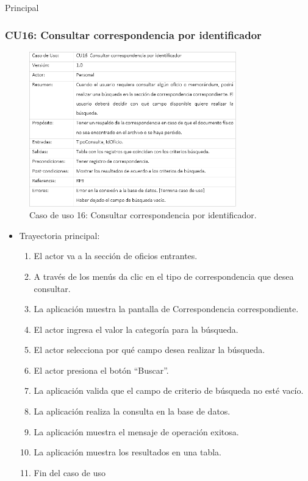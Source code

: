 \begin{UCtrayectoria}{Principal}
		\subsubsection{CU16: Consultar correspondencia por identificador}
\begin{figure}[htbp!]
		\centering
			\includegraphics[width=0.8\textwidth]{images/CU/CU16}
		\caption{Caso de uso 16: Consultar correspondencia por identificador.}
		\label{Tabla}
	\end{figure}
	
\begin{itemize}
	\item Trayectoria principal:
	\begin{enumerate}
		\item	El actor va a la sección de oficios entrantes.
		\item	A través de los menús da clic en el tipo de correspondencia que desea consultar.
		\item	La aplicación muestra la pantalla  de Correspondencia correspondiente.
		\item	El actor ingresa el valor la categoría para la búsqueda.
		\item	El actor selecciona por qué campo desea realizar la búsqueda.
		\item	El actor presiona el botón “Buscar”.
		\item	La aplicación valida que el campo de criterio de búsqueda no esté vacío.
		\item	La aplicación realiza la consulta en la base de datos.
		\item	La aplicación muestra el mensaje  de operación exitosa.
		\item	La aplicación muestra los resultados en una tabla.
		\item	Fin del caso de uso
	\end{enumerate}
	

\end{itemize}
\end{UCtrayectoria}

